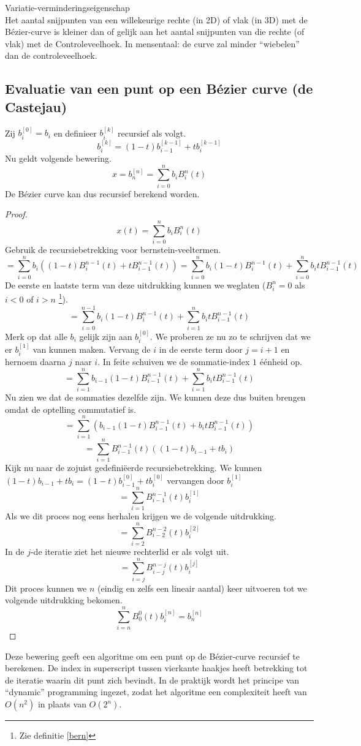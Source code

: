 \documentclass[computergesteund_ontwerp_van_curven_en_oppervlakken.tex]{subfiles}
\begin{document}
\begin{ei}
Variatie-verminderingseigenschap\\
Het aantal snijpunten van een willekeurige rechte (in 2D) of vlak (in 3D) met de B\'ezier-curve is kleiner dan of gelijk aan het aantal snijpunten van die rechte (of vlak) met de Controleveelhoek. In mensentaal: de curve zal minder ``wiebelen'' dan de controleveelhoek.
\end{ei}

\subsection{Evaluatie van een punt op een B\'ezier curve (de Castejau)}
\begin{st}
Zij $b_{i}^{[0]} = b_{i}$ en definieer $b_{i}^{[k]}$ recursief als volgt.
\[
b_{i}^{[k]}
=
(1-t)b_{i-1}^{[k-1]} + tb_{i}^{[k-1]}
\]
Nu geldt volgende bewering.
\[
x = b_{n}^{[n]} = \sum_{i=0}^{n}b_iB_{i}^{n}(t)
\]
De B\'ezier curve kan dus recursief berekend worden.
\begin{proof}
\[
x(t) = \sum_{i=0}^{n}b_iB_{i}^{n}(t)
\]
Gebruik de recursiebetrekking voor bernstein-veeltermen.
\[
= \sum_{i=0}^{n}b_i
\left( 
(1-t)B^{n-1}_{i}(t) + tB^{n-1}_{i-1}(t)
\right)
= 
\sum_{i=0}^{n}b_i
(1-t)B^{n-1}_{i}(t) + 
\sum_{i=0}^{n}b_it
B^{n-1}_{i-1}(t)
\]
De eerste en laatste term van deze uitdrukking kunnen we weglaten ($B_{i}^{n} = 0$ als $i < 0$ of $i > n$ \footnote{Zie definitie \ref{bern}}).
\[
= 
\sum_{i=0}^{n-1}b_i
(1-t)B^{n-1}_{i}(t) + 
\sum_{i=1}^{n}b_it
B^{n-1}_{i-1}(t)
\]
Merk op dat alle $b_i$ gelijk zijn aan $b_i^{[0]}$. We proberen ze nu zo te schrijven dat we er $b_i^{[1]}$ van kunnen maken. Vervang de $i$ in de eerste term door $j=i+1$ en hernoem daarna $j$ naar $i$. In feite schuiven we de sommatie-index $1$ \'e\'enheid op.
\[
= 
\sum_{i=1}^{n}b_{i-1}
(1-t)B^{n-1}_{i-1}(t) + 
\sum_{i=1}^{n}b_it
B^{n-1}_{i-1}(t)
\]
Nu zien we dat de sommaties dezelfde zijn. We kunnen deze dus buiten brengen omdat de optelling commutatief is.
\[
= 
\sum_{i=1}^{n}
\left(
b_{i-1}(1-t)B^{n-1}_{i-1}(t)
+ 
b_itB^{n-1}_{i-1}(t)
\right)
\]
\[
= 
\sum_{i=1}^{n}
B^{n-1}_{i-1}(t)
\left(
(1-t)b_{i-1}
+ 
tb_i
\right)
\]
Kijk nu naar de zojuist gedefini\"eerde recursiebetrekking. We kunnen $(1-t)b_{i-1} + tb_i = (1-t)b_{i-1}^{[0]} + tb_i^{[0]}$ vervangen door $b_{i}^{[1]}$
\[
= 
\sum_{i=1}^{n}
B^{n-1}_{i-1}(t)
b_{i}^{[1]}
\]
Als we dit proces nog eens herhalen krijgen we de volgende uitdrukking.
\[
= 
\sum_{i=2}^{n}
B^{n-2}_{i-2}(t)
b_{i}^{[2]}
\]
In de $j$-de iteratie ziet het nieuwe rechterlid er als volgt uit.
\[
= 
\sum_{i=j}^{n}
B^{n-j}_{i-j}(t)
b_{i}^{[j]}
\]
Dit proces kunnen we $n$ (eindig en zelfs een lineair aantal) keer uitvoeren tot we volgende uitdrukking bekomen.
\[
\sum_{i=n}^{n}
B^{0}_{0}(t)
b_{i}^{[n]}
= b_{n}^{[n]}
\]
\end{proof}
\end{st}
Deze bewering geeft een algoritme om een punt op de B\'ezier-curve recursief te berekenen. De index in superscript tussen vierkante haakjes heeft betrekking tot de iteratie waarin dit punt zich bevindt. In de praktijk wordt het principe van ``dynamic'' programming ingezet, zodat het algoritme een complexiteit heeft van $O(n^2)$ in plaats van $O(2^n)$.
\end{document}
